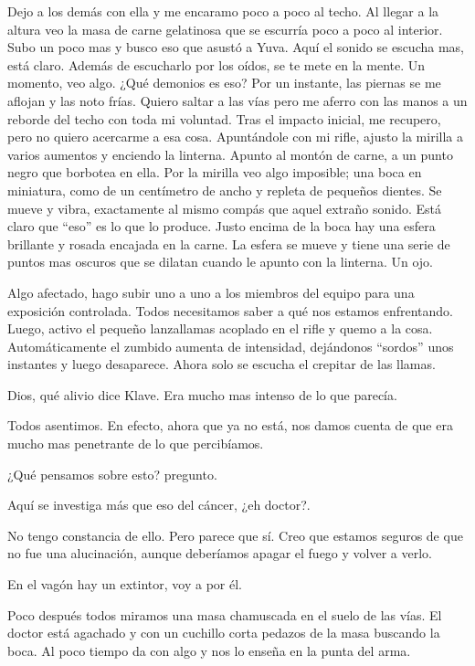 Dejo a los demás con ella y me encaramo poco a poco al techo. Al llegar a la altura veo la masa de carne gelatinosa que se escurría poco a poco al interior. Subo un poco mas y busco eso que asustó a Yuva. Aquí el sonido se escucha mas, está claro. Además de escucharlo por los oídos, se te mete en la mente. Un momento, veo algo. ¿Qué demonios es eso? Por un instante, las piernas se me aflojan y las noto frías. Quiero saltar a las vías pero me aferro con las manos a un reborde del techo con toda mi voluntad. Tras el impacto inicial, me recupero, pero no quiero acercarme a esa cosa. Apuntándole con mi rifle, ajusto la mirilla a varios aumentos y enciendo la linterna. Apunto al montón de carne, a un punto negro que borbotea en ella. Por la mirilla veo algo imposible; una boca en miniatura, como de un centímetro de ancho y repleta de pequeños dientes. Se mueve y vibra, exactamente al mismo compás que aquel extraño sonido. Está claro que ``eso'' es lo que lo produce. Justo encima de la boca hay una esfera brillante y rosada encajada en la carne. La esfera se mueve y tiene una serie de puntos mas oscuros que se dilatan cuando le apunto con la linterna. Un ojo.

Algo afectado, hago subir uno a uno a los miembros del equipo para una exposición controlada. Todos necesitamos saber a qué nos estamos enfrentando. Luego, activo el pequeño lanzallamas acoplado en el rifle y quemo a la cosa. Automáticamente el zumbido aumenta de intensidad, dejándonos ``sordos'' unos instantes y luego desaparece. Ahora solo se escucha el crepitar de las llamas.

\reply Dios, qué alivio \pause dice Klave\pauseend. Era mucho mas intenso de lo que parecía.

Todos asentimos. En efecto, ahora que ya no está, nos damos cuenta de que era mucho mas penetrante de lo que percibíamos.

\reply ¿Qué pensamos sobre esto? \pause pregunto.

\reply Aquí se investiga más que eso del cáncer, ¿eh doctor?. \klave

\reply No tengo constancia de ello. Pero parece que sí. Creo que estamos seguros de que no fue una alucinación, aunque deberíamos apagar el fuego y volver a verlo.

\reply En el vagón hay un extintor, voy a por él. \yuva

Poco después todos miramos una masa chamuscada en el suelo de las vías. El doctor está agachado y con un cuchillo corta pedazos de la masa buscando la boca. Al poco tiempo da con algo y nos lo enseña en la punta del arma.

